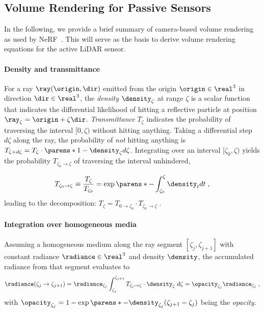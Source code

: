 \subsection{Volume Rendering for Passive Sensors}
\label{sec:revisit_vr}
In the following, we provide a brief summary of camera-based volume rendering as used by NeRF~\cite{mildenhall2020nerf,tagliasacchi2022volume}. This will serve as the basis to derive volume rendering equations for the active LiDAR sensor.

\paragraph{Density and transmittance}
For a ray $\ray(\origin, \dir)$ emitted from the origin $\origin \in \real^3$ in direction $\dir \in \real^3$, the \textit{density} $\density_\zeta$ at range $\zeta$ is a scalar function that indicates the differential likelihood of hitting a reflective particle at position $\ray_\zeta = \origin + \zeta \dir$. \textit{Transmittance} $T_{\zeta}$ indicates the probability of traversing the interval $[0, \zeta)$ without hitting anything. Taking a differential step $d\zeta$ along the ray,  the probability of \emph{not} hitting anything is $T_{\zeta+d\zeta} = T_{\zeta} \cdot \parens*{1 -\density_\zeta d\zeta}$.
Integrating over an interval $[\zeta_0, \zeta)$ yields the probability $T_{\zeta_0 \rightarrow \zeta}$ of traversing the interval unhindered,

\begin{equation}
T_{\zeta_0 \rightarrow \zeta} \equiv \frac{T_{\zeta}}{T_{\zeta_0}} = \exp\parens*{-\int_{\zeta_0}^\zeta \density_t dt}\;,
\label{eq:iccv_trans_ab}
\end{equation}
leading to the decomposition: $T_{\zeta} = T_{0 \rightarrow \zeta_0} \cdot T_{\zeta_0 \rightarrow \zeta}\;.$
    


\paragraph{Integration over homogeneous media}
Assuming a homogeneous medium along the ray segment $[\zeta_j, \zeta_{j+1}]$ with constant radiance $\radiance \in \real^3$ and density $\density$, the accumulated radiance from that segment evaluates to 
\begin{equation}
    \radiance(\zeta_j \rightarrow \zeta_{j+1}) 
    = \radiance_{\zeta_j}\int_{\zeta_j}^{\zeta_{j+1}} T_{\zeta_j \rightarrow \zeta} \cdot \density_\zeta \; d\zeta
    = \opacity_{\zeta_j} \radiance_{\zeta_j}\;,
\end{equation}
with $\opacity_{\zeta_j}=1-\exp\parens*{{-\density_{\zeta_j}(\zeta_{j+1} - \zeta_j)}}$ being the \textit{opacity}. 

